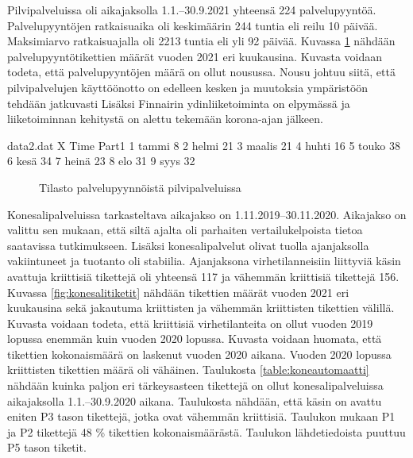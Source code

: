 Pilvipalveluissa oli aikajaksolla 1.1.--30.9.2021 yhteensä 224 palvelupyyntöä. Palvelupyyntöjen ratkaisuaika oli keskimäärin 244 tuntia eli reilu 10 päivää. Maksimiarvo ratkaisuajalla oli 2213 tuntia eli yli 92 päivää. Kuvassa \ref{fig:pilvipyynto} nähdään palvelupyyntötikettien määrät vuoden 2021 eri kuukausina. Kuvasta voidaan todeta, että palvelupyyntöjen määrä on ollut nousussa. Nousu johtuu siitä, että pilvipalvelujen käyttöönotto on edelleen kesken ja muutoksia ympäristöön tehdään jatkuvasti Lisäksi Finnairin ydinliiketoiminta on elpymässä ja liiketoiminnan kehitystä on alettu tekemään korona-ajan jälkeen.

\begin{filecontents}{data2.dat}
X Time  	Part1
1 tammi  	8
2 helmi		21
3 maalis	21
4 huhti		16
5 touko		38
6 kesä		34
7 heinä		23
8 elo       31
9 syys      32
\end{filecontents}

\begin{figure}[ht]
\caption{Tilasto palvelupyynnöistä pilvipalveluissa}
\label{fig:pilvipyynto}
\end{figure}

Konesalipalveluissa tarkasteltava aikajakso on 1.11.2019--30.11.2020. Aikajakso on valittu sen mukaan, että siltä ajalta oli parhaiten vertailukelpoista tietoa saatavissa tutkimukseen. Lisäksi konesalipalvelut olivat tuolla ajanjaksolla vakiintuneet ja tuotanto oli stabiilia. Ajanjaksona virhetilanneisiin liittyviä käsin avattuja kriittisiä tikettejä oli yhteensä 117 ja vähemmän kriittisiä tikettejä 156. Kuvassa \ref{fig:konesalitiketit} nähdään tikettien määrät vuoden 2021 eri kuukausina sekä jakautuma kriittisten ja vähemmän kriittisten tikettien välillä. Kuvasta voidaan todeta, että kriittisiä virhetilanteita on ollut vuoden 2019 lopussa enemmän kuin vuoden 2020 lopussa. Kuvasta voidaan huomata, että tikettien kokonaismäärä on laskenut vuoden 2020 aikana. Vuoden 2020 lopussa kriittisten tikettien määrä oli vähäinen.  Taulukosta \ref{table:koneautomaatti} nähdään kuinka paljon eri tärkeysasteen tikettejä on ollut konesalipalveluissa aikajaksolla 1.1.--30.9.2020 aikana. Taulukosta nähdään, että käsin on avattu eniten P3 tason tikettejä, jotka ovat vähemmän kriittisiä. Taulukon mukaan P1 ja P2 tikettejä 48 \% tikettien kokonaismäärästä. Taulukon lähdetiedoista puuttuu P5 tason tiketit.

